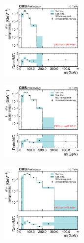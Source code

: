  \begin{figure}[htp!]
	\centering
	\begin{subfigure}
          \centering
          \includegraphics[width=0.45\textwidth]{figures/multijet/unfolding/dijet/closure_herwig_binnedResult_ungroomed_0.pdf}
        \end{subfigure}%
        \begin{subfigure}
          \centering
          \includegraphics[width=0.45\textwidth]{figures/multijet/unfolding/dijet/closure_herwig_binnedResult_ungroomed_1.pdf}
        \end{subfigure}%
        \begin{subfigure}
          \centering
          \includegraphics[width=0.45\textwidth]{figures/multijet/unfolding/dijet/closure_herwig_binnedResult_ungroomed_2.pdf}
        \end{subfigure}%

\end{figure}
